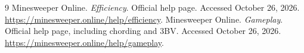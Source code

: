 \documentclass[11pt,letterpaper]{article}
\begin{document}
\begin{thebibliography}{9}
 Minesweeper Online. \emph{Efficiency}. Official help page. Accessed October 26, 2026. \url{https://minesweeper.online/help/efficiency}.
 Minesweeper Online. \emph{Gameplay}. Official help page, including chording and 3BV. Accessed October 26, 2026. \url{https://minesweeper.online/help/gameplay}.
\end{thebibliography}
\end{document}
